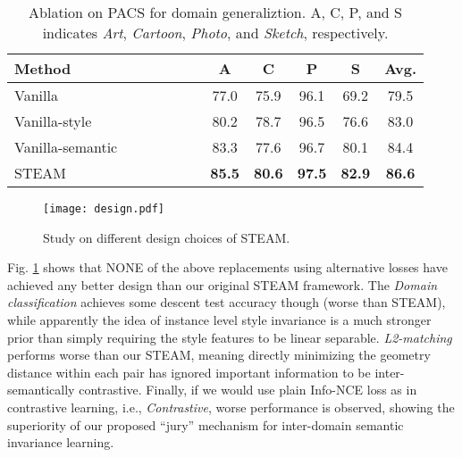 \documentclass[10pt,twocolumn,letterpaper]{article}
\newcommand{\0}{{\bf 0}}
\begin{document}
\begin{table}[t]
\center
\scriptsize
\setlength{\tabcolsep}{4pt}
\renewcommand{\arraystretch}{1.4}
\caption{Ablation on PACS for domain generaliztion. A, C, P, and S indicates \textit{Art}, \textit{Cartoon}, \textit{Photo}, and \textit{Sketch}, respectively.}
\vspace{0.2cm}
\begin{tabular}{l | c c c c | c c c c | c}
\hline

Method & & & & & A & C & P & S & Avg. \\ \hline
Vanilla & &~ &~ &~ & 77.0 & 75.9 & 96.1 & 69.2 & 79.5 \\
Vanilla-style & & & &~ & 80.2 & 78.7 & 96.5 & 76.6 & 83.0  \\
Vanilla-semantic & &~ &~ &  & 83.3 & 77.6 & 96.7 & 80.1 & 84.4 \\
\hline
STEAM & & & &  & \textbf{85.5} & \textbf{80.6} & \textbf{97.5} & \textbf{82.9} & \textbf{86.6} \\
\hline
\end{tabular}
\vspace{-0.15in}
\label{tab:ablation-pacs}
\end{table}

\begin{figure}[t]
\center
\texttt{[image: design.pdf]}
\caption{Study on different design choices of STEAM.}
\vspace{-0.2in}
\label{fig:design}
\end{figure}

Fig. \ref{fig:design} shows that NONE of the above replacements using alternative losses have achieved any better design than our original STEAM framework. The \emph{Domain classification} achieves some descent test accuracy though (worse than STEAM), while apparently the idea of instance level style invariance is a much stronger prior than simply requiring the style features to be linear separable. \emph{L2-matching} performs worse than our STEAM, meaning directly minimizing the geometry distance within each  pair has ignored important information to be inter-semantically contrastive. Finally, if we would use plain Info-NCE loss as in contrastive learning, i.e., \emph{Contrastive}, worse performance is observed, showing the superiority of our proposed ``jury'' mechanism for inter-domain semantic invariance learning.
\end{document}

